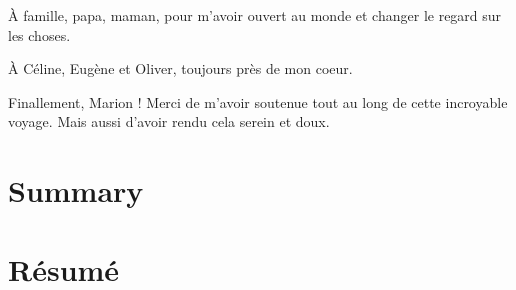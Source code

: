 À famille, papa, maman, pour m'avoir ouvert au monde et changer le regard sur les choses.

À Céline, Eugène et Oliver, toujours près de mon coeur. %

Finallement, Marion ! Merci de m'avoir soutenue tout au long de cette incroyable voyage. Mais aussi d'avoir rendu cela serein et doux. 
 
 \chapter{Summary}
 
 \chapter{Résumé}
 
\begin{fullwidth}\tableofcontents\listoffigures\listoftables\end{fullwidth}